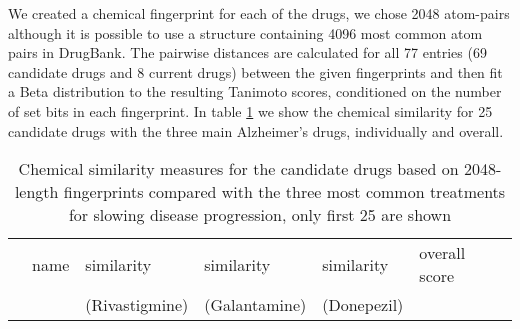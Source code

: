 \documentclass[preprint,11pt]{elsarticle}
\begin{document}
We created a chemical fingerprint for each of the drugs, we chose 2048 atom-pairs although it is possible to use a structure containing 4096 most common atom pairs in DrugBank. The pairwise distances are calculated for all 77 entries (69 candidate drugs and 8 current drugs) between the given fingerprints and then fit a Beta distribution to the resulting Tanimoto scores, conditioned on the number of set bits in each fingerprint. In table \ref{comp1} we show the chemical similarity for 25 candidate drugs with the three main Alzheimer's drugs, individually and overall.


\begin{table}[h]
\scriptsize
  \centering \caption{Chemical similarity measures for the candidate drugs based on 2048-length fingerprints compared with the three most common treatments for slowing disease progression, only first 25 are shown}\label{comp1}
\centering
\begin{tabular}{llllll}
  \hline
 & name & similarity & similarity & similarity & overall score\\ 
              &                   & (Rivastigmine) & (Galantamine)  & (Donepezil)          & \\
  \hline 
  

\end{tabular}
\end{table}
\end{document}
